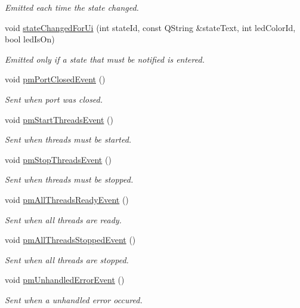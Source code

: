 \begin{DoxyCompactItemize}
\begin{DoxyCompactList}\small\item\em Emitted each time the state changed. \end{DoxyCompactList}\item 
void \hyperlink{classmdt_port_manager_ae00d513ed335fbd203852dcb7180005c}{stateChangedForUi} (int stateId, const QString \&stateText, int ledColorId, bool ledIsOn)
\begin{DoxyCompactList}\small\item\em Emitted only if a state that must be notified is entered. \end{DoxyCompactList}\item 
void \hyperlink{classmdt_port_manager_ae77c1b24291797704488beda0009c57a}{pmPortClosedEvent} ()
\begin{DoxyCompactList}\small\item\em Sent when port was closed. \end{DoxyCompactList}\item 
void \hyperlink{classmdt_port_manager_aa12ccb053b3ce050a2482a957b28222e}{pmStartThreadsEvent} ()
\begin{DoxyCompactList}\small\item\em Sent when threads must be started. \end{DoxyCompactList}\item 
void \hyperlink{classmdt_port_manager_a7b81ee6491167fa17574d840720d9b33}{pmStopThreadsEvent} ()
\begin{DoxyCompactList}\small\item\em Sent when threads must be stopped. \end{DoxyCompactList}\item 
void \hyperlink{classmdt_port_manager_a6dd5529e6de23897fe5082ee4a33fa3d}{pmAllThreadsReadyEvent} ()
\begin{DoxyCompactList}\small\item\em Sent when all threads are ready. \end{DoxyCompactList}\item 
void \hyperlink{classmdt_port_manager_a1bfd4d20867ecae2cad1b95b52860b12}{pmAllThreadsStoppedEvent} ()
\begin{DoxyCompactList}\small\item\em Sent when all threads are stopped. \end{DoxyCompactList}\item 
void \hyperlink{classmdt_port_manager_a94d3fa4a26f8686449313a54003f0b4d}{pmUnhandledErrorEvent} ()
\begin{DoxyCompactList}\small\item\em Sent when a unhandled error occured. \end{DoxyCompactList}\item 

\end{DoxyCompactItemize}
